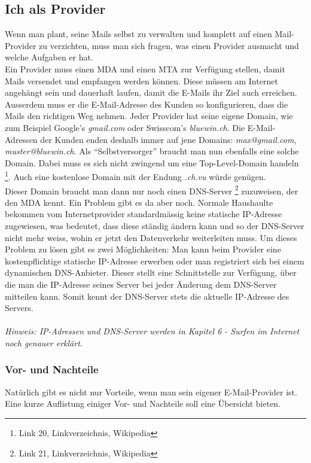 \subsection{Ich als Provider}
Wenn man plant, seine Mails selbst zu verwalten und komplett auf einen Mail-Provider zu verzichten, muss man sich fragen, was einen Provider ausmacht und welche Aufgaben er hat. 
\\
Ein Provider muss einen MDA und einen MTA zur Verfügung stellen, damit Mails versendet und empfangen werden können. Diese müssen am Internet angehängt sein und dauerhaft laufen, damit die E-Mails ihr Ziel auch erreichen.
\\
Ausserdem muss er die E-Mail-Adresse des Kunden so konfigurieren, dass die Mails den richtigen Weg nehmen. Jeder Provider hat seine eigene Domain, wie zum Beispiel Google's \textit{gmail.com} oder Swisscom's \textit{bluewin.ch}. Die E-Mail-Adressen der Kunden enden deshalb immer auf jene Domains: \textit{max@gmail.com}, \textit{muster@bluewin.ch}. Als ``Selbstversorger'' braucht man nun ebenfalls eine solche Domain. Dabei muss es sich nicht zwingend um eine Top-Level-Domain handeln \footnote{Link 20, Linkverzeichnis, Wikipedia}. Auch eine kostenlose Domain mit der Endung \textit{.ch.vu} würde genügen.
\\
Dieser Domain braucht man dann nur noch einen DNS-Server \footnote{Link 21, Linkverzeichnis, Wikipedia} zuzuweisen, der den MDA kennt.
Ein Problem gibt es da aber noch. Normale Haushaulte bekommen vom Internetprovider standardmässig keine statische IP-Adresse zugewiesen, was bedeutet, dass diese ständig ändern kann und so der DNS-Server nicht mehr weiss, wohin er jetzt den Datenverkehr weiterleiten muss. Um dieses Problem zu lösen gibt es zwei Möglichkeiten: Man kann beim Provider eine kostenpflichtige statische IP-Adresse erwerben oder man registriert sich bei einem dynamischen DNS-Anbieter. Dieser stellt eine Schnittstelle zur Verfügung, über die man die IP-Adresse seines Server bei jeder Änderung dem DNS-Server mitteilen kann. Somit kennt der DNS-Server stets die aktuelle IP-Adresse des Servers.
\\
\\
\textit{Hinweis: IP-Adressen und DNS-Server werden in Kapitel 6 - Surfen im Internet noch genauer erklärt.}

\subsubsection{Vor- und Nachteile}
Natürlich gibt es nicht nur Vorteile, wenn man sein eigener E-Mail-Provider ist. Eine kurze Auflistung einiger Vor- und Nachteile soll eine Übersicht bieten.
\\

